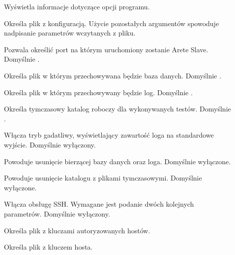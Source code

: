 \documentclass[00-praca-magisterska.tex]{subfiles}
\begin{document}
\begin{description}
\item[]

Wyświetla informacje dotyczące opcji programu.

\item[]

Określa plik z konfiguracją. Użycie pozostałych argumentów spowoduje nadpisanie
parametrów wczytanych z pliku.

\item[]

Pozwala określić port na którym uruchomiony zostanie Arete Slave. Domyślnie
.

\item[]

Określa plik w którym przechowywana będzie baza danych. Domyślnie .

\item[]

Określa plik w którym przechowywany będzie log. Domyślnie .

\item[]

Określa tymczasowy katalog roboczy dla wykonywanych testów. Domyślnie
.

\item[]

Włącza tryb gadatliwy, wyświetlający zawartość loga na standardowe wyjście.
Domyślnie wyłączony.

\item[]

Powoduje usunięcie bierzącej bazy danych oraz loga. Domyślnie wyłączone.

\item[]

Powoduje usunięcie katalogu z plikami tymczasowymi. Domyślnie wyłączone.

\item[]

Włącza obsługę SSH. Wymagane jest podanie dwóch kolejnych parametrów. Domyślnie
wyłączony.

\item[]

Określa plik z kluczami autoryzowanych hostów.

\item[]

Określa plik z kluczem hosta.

\end{description}
\end{document}

